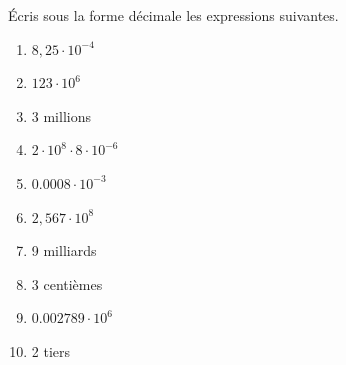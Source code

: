 %
%
  Écris sous la forme décimale les expressions suivantes.
  \begin{enumerate}[cols=2]
    \item $8,25 \cdot 10^{- 4} $
    \item $123 \cdot 10^{6} $
    \item 3 millions
    \item $2 \cdot 10^{8} \cdot 8 \cdot 10^{- 6}$
    \item $\num{0,0008}\cdot 10^{- 3}$
    \item $2,567 \cdot 10^{8}$
    \item 9 milliards
    \item 3 centièmes
    \item $\num{0,002789} \cdot 10^{6} $
    \item 2 tiers
  \end{enumerate}
